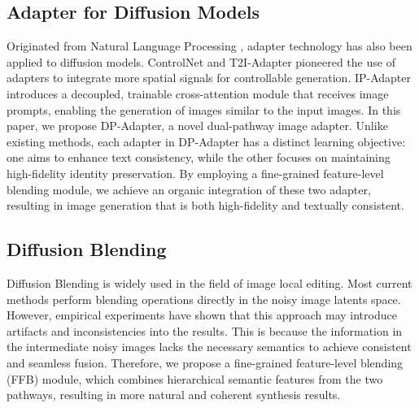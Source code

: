 \subsection{Adapter for Diffusion Models}
Originated from Natural Language Processing \cite{houlsby2019parameter}, adapter technology has also been applied to diffusion models. ControlNet \cite{zhang2023adding} and T2I-Adapter \cite{mou2024t2i} pioneered the use of adapters to integrate more spatial signals for controllable generation. IP-Adapter \cite{ye2023ip} introduces a decoupled, trainable cross-attention module that receives image prompts, enabling the generation of images similar to the input images. 
In this paper, we propose DP-Adapter, a novel dual-pathway image adapter. Unlike existing methods, each adapter in DP-Adapter has a distinct learning objective: one aims to enhance text consistency, while the other focuses on maintaining high-fidelity identity preservation. By employing a fine-grained feature-level blending module, we achieve an organic integration of these two adapter, resulting in image generation that is both high-fidelity and textually consistent.



\subsection{Diffusion Blending}

Diffusion Blending is widely used in the field of image local editing. Most current methods \cite{lugmayr2022repaint, avrahami2023blended, avrahami2022blended,couairon2022diffedit,zhao2023magicfusion} perform blending operations directly in the noisy image latents space. However, empirical experiments have shown that this approach may introduce artifacts and inconsistencies into the results. This is because the information in the intermediate noisy images lacks the necessary semantics to achieve consistent and seamless fusion. Therefore, we propose a fine-grained feature-level blending (FFB) module, which combines hierarchical semantic features from the two pathways, resulting in more natural and coherent synthesis results.